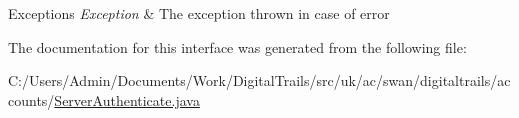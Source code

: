 \begin{DoxyExceptions}{Exceptions}
{\em Exception} & The exception thrown in case of error \\
\hline
\end{DoxyExceptions}


The documentation for this interface was generated from the following file\+:\begin{DoxyCompactItemize}
\item 
C\+:/\+Users/\+Admin/\+Documents/\+Work/\+Digital\+Trails/src/uk/ac/swan/digitaltrails/accounts/\hyperlink{_server_authenticate_8java}{Server\+Authenticate.\+java}\end{DoxyCompactItemize}
